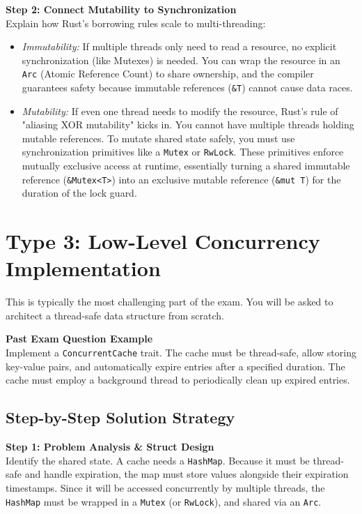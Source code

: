 \textbf{Step 2: Connect Mutability to Synchronization}\\
Explain how Rust's borrowing rules scale to multi-threading:
\begin{itemize}
    \item \textit{Immutability:} If multiple threads only need to read a resource, no explicit synchronization (like Mutexes) is needed. You can wrap the resource in an \texttt{Arc} (Atomic Reference Count) to share ownership, and the compiler guarantees safety because immutable references (\texttt{\&T}) cannot cause data races.
    \item \textit{Mutability:} If even one thread needs to modify the resource, Rust's rule of "aliasing XOR mutability" kicks in. You cannot have multiple threads holding mutable references. To mutate shared state safely, you must use synchronization primitives like a \texttt{Mutex} or \texttt{RwLock}. These primitives enforce mutually exclusive access at runtime, essentially turning a shared immutable reference (\texttt{\&Mutex<T>}) into an exclusive mutable reference (\texttt{\&mut T}) for the duration of the lock guard.
\end{itemize}

\section{Type 3: Low-Level Concurrency Implementation}

This is typically the most challenging part of the exam. You will be asked to architect a thread-safe data structure from scratch.

\begin{exambox}
\textbf{Past Exam Question Example}\\
Implement a \texttt{ConcurrentCache} trait. The cache must be thread-safe, allow storing key-value pairs, and automatically expire entries after a specified duration. The cache must employ a background thread to periodically clean up expired entries.
\end{exambox}

\subsection*{Step-by-Step Solution Strategy}

\textbf{Step 1: Problem Analysis \& Struct Design}\\
Identify the shared state. A cache needs a \texttt{HashMap}. Because it must be thread-safe and handle expiration, the map must store values alongside their expiration timestamps.
Since it will be accessed concurrently by multiple threads, the \texttt{HashMap} must be wrapped in a \texttt{Mutex} (or \texttt{RwLock}), and shared via an \texttt{Arc}.

